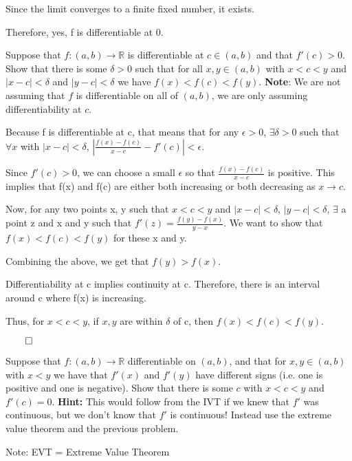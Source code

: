 \documentclass[answers]{exam}
\theoremstyle{remark}
\theoremstyle{definition}
\newcommand{\RR}{\mathbb{R}}
\begin{document}
\begin{questions}
\begin{parts}
\begin{solution}
Since the limit converges to a finite fixed number, it exists.

Therefore, yes, f is differentiable at 0.

\end{solution}
\end{parts}
\question[4] Suppose that $f: (a,b) \to \RR$ is differentiable at $c \in (a,b)$ and that $f'(c)>0$. Show that there is some $\delta >0$ such that for all $x,y \in (a,b)$ with $x<c<y$ and $|x-c|< \delta$ and $|y-c|< \delta$ we have $f(x)<f(c)< f(y)$. \textbf{Note}: We are not assuming that $f$ is differentiable on all of $(a,b)$, we are only assuming differentiability at $c$.
\begin{solution}

Because f is differentiable at c, that means that for any $\epsilon > 0$,
$\exists \delta > 0$ such that $\forall x$ with $|x-c| < \delta$,
$\left| \frac{f(x)-f(c)}{x-c} - f'(c) \right| < \epsilon$.

Since $f'(c) > 0$, we can choose a small $\epsilon$ so that
$\frac{f(x)-f(c)}{x-c}$ is positive. This implies that f(x)
and f(c) are either both increasing or both decreasing as $x \to c$.

Now, for any two points x, y such that $x < c < y$
and $|x-c| < \delta$, $|y-c| < \delta$, $\exists$ a point
z and x and y such that $f'(z) = \frac{f(y)-f(x)}{y-x}$.
We want to show that $f(x) < f(c) < f(y)$ for these x and y.

Combining the above, we get that $f(y) > f(x)$.

Differentiability at c implies continuity at c.
Therefore, there is an interval around c where f(x) is increasing.

Thus, for $x < c < y$, if $x, y$ are within $\delta$ of c, then
$f(x) < f(c) < f(y)$.

$\qed$

\end{solution}

\question[4] Suppose that $f:(a,b) \to \RR$ differentiable on $(a,b)$, and that for $x,y \in (a,b)$ with $x<y$ we have that $f'(x)$ and $f'(y)$ have different signs (i.e. one is positive and one is negative). Show that there  is some $c$ with $x<c<y$ and $f'(c)=0$. \textbf{Hint:} This would follow from the IVT if we knew that $f'$ was continuous, but we don't know that $f'$ is continuous! Instead use the extreme value theorem and the previous problem.
\begin{solution}

Note: EVT = Extreme Value Theorem


\end{solution}
\end{questions}
\end{document}
